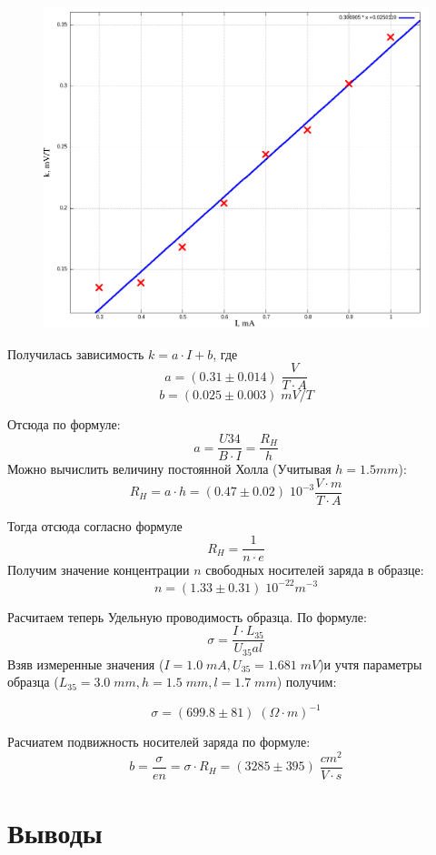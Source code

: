 \documentclass{article}
\begin{document}
\begin{figure}[H]
    \centering
    \includegraphics[width=\textwidth]{k-I.png}
\end{figure}

Получилась зависимость \( k = a \cdot I + b \), где
\[ a = (0.31 \pm 0.014)\; \frac{V}{T\cdot A} \]
\[ b = (0.025 \pm 0.003)\; mV/T \]

Отсюда по формуле:
\[ a = \frac{U34}{B\cdot I} = \frac{R_H}{h} \]
Можно вычислить величину постоянной Холла (Учитывая \(h = 1.5 mm\)):
\[ R_H = a\cdot h = (0.47 \pm 0.02) \; 10^{-3}\frac{V\cdot m}{T\cdot A} \]

Тогда отсюда согласно формуле
\[ R_H = \frac{1}{n\cdot e} \]
Получим значение концентрации \(n\) свободных носителей заряда в образце:
\[ n = (1.33 \pm 0.31)\; 10^{-22}m^{-3} \]

Расчитаем теперь Удельную проводимость образца. По формуле:
\[ \sigma = \frac{I\cdot L_{35}}{U_{35}al} \]
Взяв измеренные значения (\( I = 1.0\; mA, U_{35} = 1.681\; mV \))и учтя параметры
образца (\(L_{35} = 3.0\; mm, h = 1.5\; mm, l = 1.7\; mm\)) получим:

\[ \sigma = (699.8 \pm 81)\; (\Omega\cdot m)^{-1} \]

Расчиатем подвижность носителей заряда по формуле:
\[ b = \frac{\sigma}{en} = \sigma\cdot R_H = (3285 \pm 395)\; \frac{cm^2}{V\cdot s} \]

\section{Выводы}
\end{document}
